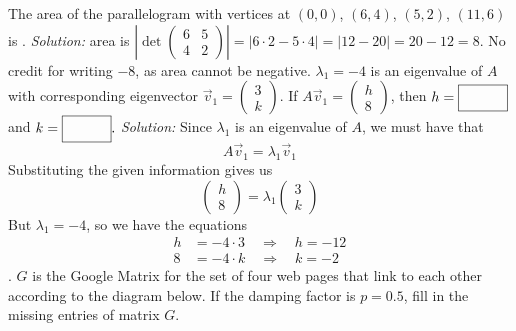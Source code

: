 \fi 
\ifnum {}
    The area of the parallelogram with vertices at $(0,0)$, $(6,4)$, $(5,2)$, $(11,6)$ is \framebox{\strut\hspace{1cm}}. 
    \ifnum {} {\color{DarkBlue} \textit{Solution:} area is $\left| \det \begin{pmatrix} 6&5\\4&2\end{pmatrix} \right| = \left| 6\cdot2 - 5\cdot4 \right| = | 12 - 20| = 20 - 12 = 8$. No credit for writing $-8$, as area cannot be negative. } \newpage \fi    
\fi 
\ifnum {} 
    $\lambda_1=-4$ is an eigenvalue of $A$ with corresponding eigenvector $\vec v_1 = \begin{pmatrix} 3\\k\end{pmatrix}$. If $A\vec v_1 = \begin{pmatrix} h\\8\end{pmatrix}$, then $h = \framebox{\strut\hspace{1cm}}$ and $k = \framebox{\strut\hspace{1cm}}.$
    \ifnum {} {\color{DarkBlue} \textit{Solution:} Since $\lambda_1$ is an eigenvalue of $A$, we must have that $$A\vec v_1 = \lambda_1 \vec v_1$$ Substituting the given information gives us $$\begin{pmatrix} h\\8\end{pmatrix} = \lambda_1 \begin{pmatrix} 3\\k\end{pmatrix}$$ 
    But $\lambda_1 =-4$, so we have the equations \begin{align}
        h &= -4\cdot 3 \quad \Rightarrow \quad h = -12\\
        8 &=-4\cdot k \quad \Rightarrow \quad k = -2
    \end{align}.   } \fi    
\fi 
\ifnum {}
    $G$ is the Google Matrix for the set of four web pages that link to each other according to the diagram below. If the damping factor is $p=0.5$, fill in the missing entries of matrix $G$. 
    \vspace{4pt}
    
